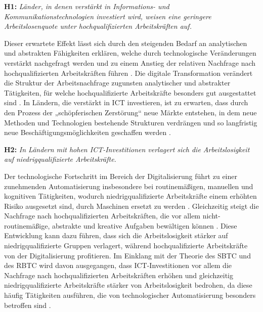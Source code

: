\textbf{H1:} \textit{Länder, in denen verstärkt in Informations- und Kommunikationstechnologien 
investiert wird, weisen eine geringere Arbeitslosenquote unter hochqualifizierten Arbeitskräften 
auf.}

Dieser erwartete Effekt lässt sich durch den steigenden Bedarf an analytischen und abstrakten 
Fähigkeiten erklären, welche durch technologische Veränderungen verstärkt nachgefragt werden und 
zu einem Anstieg der relativen Nachfrage nach hochqualifizierten Arbeitskräften führen 
\parencite[vgl.][S. 1044–1045]{acemoglu2011skills}. Die digitale Transformation verändert die 
Struktur der Arbeitsnachfrage zugunsten analytischer und abstrakter Tätigkeiten, für welche 
hochqualifizierte Arbeitskräfte besonders gut ausgestattet sind 
\parencite[vgl.][S. 1071]{acemoglu2011skills}. In Ländern, die verstärkt in \ac{ICT} investieren, 
ist zu erwarten, dass durch den Prozess der „schöpferischen Zerstörung“ neue Märkte entstehen, in 
dem neue Methoden und Technologien bestehende Strukturen verdrängen und so langfristig neue 
Beschäftigungsmöglichkeiten geschaffen werden \parencite[vgl.][S. 83]{schumpeter1976capitalism}.

\textbf{H2:} \textit{In Ländern mit hohen \ac{ICT}-Investitionen verlagert sich die 
Arbeitslosigkeit auf niedrigqualifizierte Arbeitskräfte.}

Der technologische Fortschritt im Bereich der Digitalisierung führt zu einer zunehmenden 
Automatisierung insbesondere bei routinemäßigen, manuellen und kognitiven Tätigkeiten, wodurch 
niedrigqualifizierte Arbeitskräfte einem erhöhten Risiko ausgesetzt sind, durch Maschinen ersetzt 
zu werden \parencite[vgl.][S. 9–12]{autor2015whyare}. Gleichzeitig steigt die Nachfrage nach 
hochqualifizierten Arbeitskräften, die vor allem nicht-routinemäßige, abstrakte und kreative 
Aufgaben bewältigen können \parencite[vgl.][S. 12]{autor2015whyare}. Diese Entwicklung kann dazu 
führen, dass sich die Arbeitslosigkeit stärker auf niedrigqualifizierte Gruppen verlagert, 
während hochqualifizierte Arbeitskräfte von der Digitalisierung profitieren. Im Einklang mit der 
Theorie des \ac{SBTC} und des \ac{RBTC} wird davon ausgegangen, dass \ac{ICT}-Investitionen vor 
allem die Nachfrage nach hochqualifizierten Arbeitskräften erhöhen und gleichzeitig 
niedrigqualifizierte Arbeitskräfte stärker von Arbeitslosigkeit bedrohen, da diese häufig 
Tätigkeiten ausführen, die von technologischer Automatisierung besonders betroffen sind 
\parencite[vgl.][S. 1070–1072]{acemoglu2011skills}.

